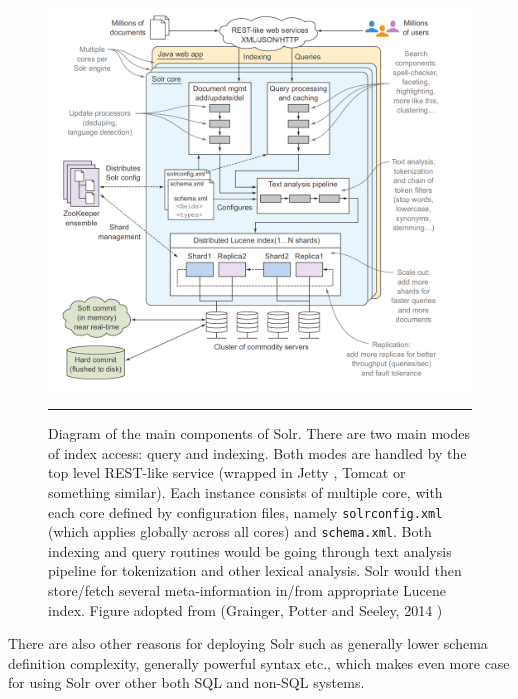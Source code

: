 \begin{figure}[htbp]
    \includegraphics[width=6in]{Figures/solr_components.png}
    \rule{35em}{0.5pt}
  \caption[Diagram of the main components of Solr.]{Diagram of the main components of Solr. There are two main modes of index access: query and indexing. Both modes are handled by the top level REST-like service (wrapped in Jetty \citep{jetty}, Tomcat \citep{apachetomcat} or something similar). Each instance consists of multiple core, with each core defined by configuration files, namely \texttt{solrconfig.xml} (which applies globally across all cores) and \texttt{schema.xml}. Both indexing and query routines would be going through text analysis pipeline for tokenization and other lexical analysis. Solr would then store/fetch several meta-information in/from appropriate Lucene index. Figure adopted from (Grainger, Potter and Seeley, 2014 \citep{grainger2014solr})}
  \label{fig:SolrComponents}
\end{figure}


There are also other reasons for deploying Solr such as generally lower schema definition complexity, generally powerful syntax etc., which makes even more case for using Solr over other both SQL and non-SQL systems.


